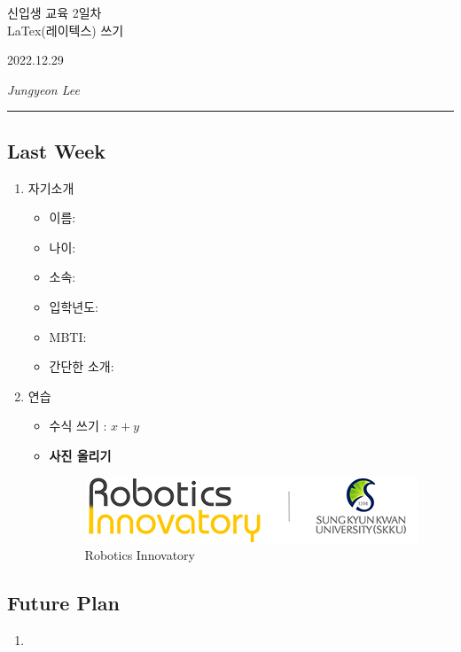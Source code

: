 \documentclass[a4paper,12pt]{article}
\begin{document}
\begin{center} %
\LARGE {신입생 교육 2일차} \\
\vspace{10pt} %
\small {LaTex(레이텍스) 쓰기}
\end{center}

\begin{flushright} %
2022.12.29

\end{flushright} %
\begin{flushright}
\textit{Jungyeon Lee} %
\rule{\linewidth}{1pt}
\end{flushright}

\begin{flushleft}
\section*{Last Week} %
\end{flushleft}

\begin{enumerate} %

\item 자기소개 %
\begin{itemize} %
    \item 이름: 
    \item 나이: 
    \item 소속: 
    \item 입학년도: 
    \item MBTI: 
    \item 간단한 소개: 
\end{itemize}

\item 연습
\begin{itemize}
	\item 수식 쓰기 : $x+y$
	\item \textbf{사진 올리기} %
	\begin{figure}[h] %
	    \centering
	    \includegraphics[scale=1.5]{logo.png} %
	    \caption{Robotics Innovatory}
	    \label{fig:my_label}
	\end{figure}

\end{itemize}

\end{enumerate} %

\newpage %

\begin{flushleft}
\section*{Future Plan}
\end{flushleft}

\begin{enumerate}

\item 

\end{enumerate}
\end{document}

